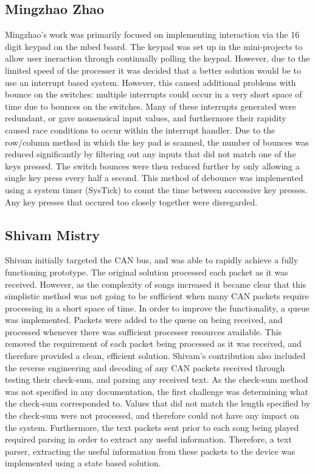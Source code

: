 \subsection*{Mingzhao Zhao}
Mingzhao's work was primarily focused on implementing interaction via 
the 16 digit keypad on the mbed board. The keypad was set up in the mini-projects 
to allow user ineraction through continually polling the keypad. However, due 
to the limited speed of the processer it was decided that a better solution 
would be to use an interrupt based system.
However, this caused additional problems with bounce on the switches: 
multiple interrupts could occur in a very short space of time due to bounces on 
the switches. Many of these interrupts generated were redundant, or gave 
nonsensical input values, and furthermore their rapidity caused race conditions 
to occur within the interrupt handler. 
Due to the row/column method in which the key pad is scanned, the 
number of bounces was reduced significantly by filtering out any inputs that 
did not match one of the keys pressed. The switch bounces were then reduced 
further by only allowing a single key press every half a second. 
This method of debounce was implemented using a system 
timer (SysTick) to count the time between successive key presses. Any key 
presses that occured too closely together were disregarded. 

\subsection*{Shivam Mistry}
Shivam initially targeted the CAN bus, and was able to rapidly achieve a fully 
functioning prototype. The original solution processed each packet as it was 
received. However, as the complexity of songs increased it became clear that this 
simplistic method was not going to be sufficient when many CAN packets require 
processing in a short space of time.
In order to improve the functionality, a queue was implemented. Packets were 
added to the queue on being received, and processed whenever there was sufficient
processer resources available.
This removed the requirement of each packet being processed as it was received,
 and therefore provided a clean, efficient solution.
Shivam's contribution also included the reverse engineering and decoding of any
 CAN packets received through testing their check-sum, and parsing any received 
text.
As the check-sum method was not specified in any documentation, the first 
challenge was determining what the check-sum corresponded to. Values that did 
not match the length specified by the check-sum were not processed, and therefore 
could not have any impact on the system. Furthermore, the text packets sent prior 
to each song being played required parsing in order to extract any useful 
information. Therefore, a text parser, extracting the useful information from 
these packets to the device was implemented using a state based solution. 

